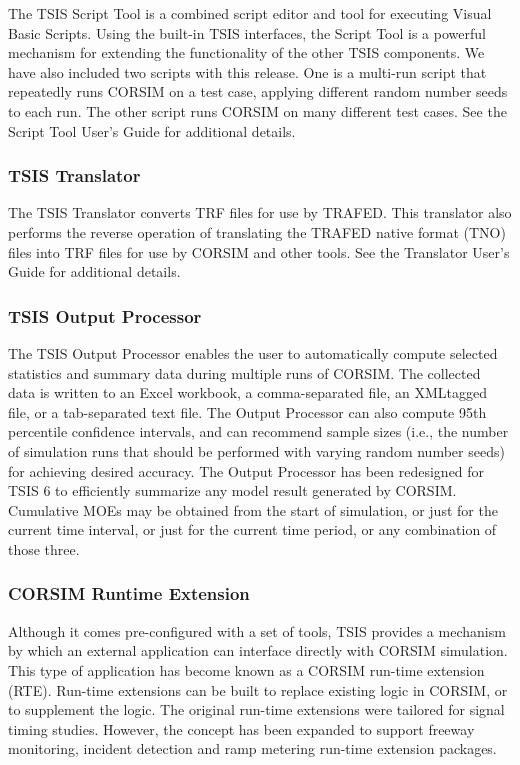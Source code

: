 The TSIS Script Tool is a combined script editor and tool for executing Visual Basic Scripts. Using the built-in
TSIS interfaces, the Script Tool is a powerful mechanism for extending the functionality of the other TSIS
components. We have also included two scripts with this release. One is a multi-run script that repeatedly runs
CORSIM on a test case, applying different random number seeds to each run. The other script runs CORSIM on
many different test cases. See the Script Tool User's Guide for additional details.

\subsubsection{TSIS Translator}

The TSIS Translator converts TRF files for use by TRAFED. This translator also performs the reverse operation of
translating the TRAFED native format (TNO) files into TRF files for use by CORSIM and other tools. See the
Translator User's Guide for additional details.

\subsubsection{TSIS Output Processor}

The TSIS Output Processor enables the user to automatically compute selected statistics and summary data during
multiple runs of CORSIM. The collected data is written to an Excel workbook, a comma-separated file, an XMLtagged
file, or a tab-separated text file. The Output Processor can also compute 95th percentile confidence intervals,
and can recommend sample sizes (i.e., the number of simulation runs that should be performed with varying random
number seeds) for achieving desired accuracy. The Output Processor has been redesigned for TSIS 6 to efficiently
summarize any model result generated by CORSIM. Cumulative MOEs may be obtained from the start of
simulation, or just for the current time interval, or just for the current time period, or any combination of those three.

\subsubsection{CORSIM Runtime Extension}

Although it comes pre-configured with a set of tools, TSIS provides a mechanism by which an external application
can interface directly with CORSIM simulation. This type of application has become known as a CORSIM run-time
extension (RTE). Run-time extensions can be built to replace existing logic in CORSIM, or to supplement the
logic. The original run-time extensions were tailored for signal timing studies. However, the concept has been
expanded to support freeway monitoring, incident detection and ramp metering run-time extension packages.

